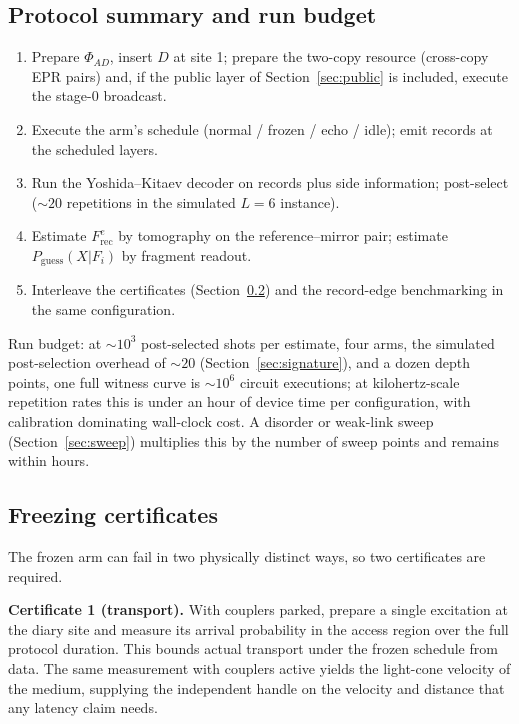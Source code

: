 \documentclass[11pt]{article}
\newcommand{\Frec}{F^{e}_{\mathrm{rec}}}
\begin{document}
\subsection{Protocol summary and run budget}
\label{sec:protocolbox}

\begin{enumerate}[itemsep=1pt]
\item Prepare $\Phi_{AD}$, insert $D$ at site 1; prepare the two-copy
  resource (cross-copy EPR pairs) and, if the public layer of
  Section~\ref{sec:public} is included, execute the stage-0
  broadcast.
\item Execute the arm's schedule (normal / frozen / echo / idle);
  emit records at the scheduled layers.
\item Run the Yoshida--Kitaev decoder on records plus side
  information; post-select ($\sim 20$ repetitions in the simulated
  $L=6$ instance).
\item Estimate $\Frec$ by tomography on the reference--mirror pair;
  estimate $P_{\mathrm{guess}}(X|F_i)$ by fragment readout.
\item Interleave the certificates (Section~\ref{sec:certificates})
  and the record-edge benchmarking in the same configuration.
\end{enumerate}

Run budget: at $\sim 10^3$ post-selected shots per estimate, four
arms, the simulated post-selection overhead of $\sim 20$
(Section~\ref{sec:signature}), and a dozen depth points, one full
witness curve is $\sim 10^6$ circuit executions; at kilohertz-scale
repetition rates this is under an hour of device time per
configuration, with calibration dominating wall-clock cost.  A
disorder or weak-link sweep (Section~\ref{sec:sweep}) multiplies this
by the number of sweep points and remains within hours.

\subsection{Freezing certificates}
\label{sec:certificates}

The frozen arm can fail in two physically distinct ways, so two
certificates are required.

\textbf{Certificate 1 (transport).}  With couplers parked, prepare a
single excitation at the diary site and measure its arrival
probability in the access region over the full protocol duration.
This bounds actual transport under the frozen schedule from data.
The same measurement with couplers active yields the light-cone
velocity of the medium, supplying the independent handle on the
velocity and distance that any latency claim needs.
\end{document}
